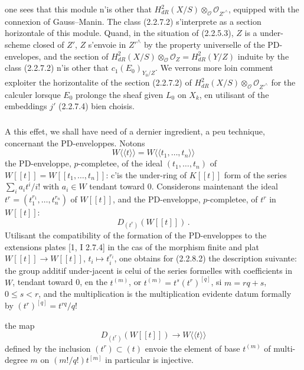 \documentclass[12pt,a4paper]{article}
\theoremstyle{plain}
\theoremstyle{definition}
\theoremstyle{remark}
\begin{document}
one sees that this module n'is other that $H_{dR}^2(X/S) \otimes_\mathcal{O} \mathcal{O}_{Z'^\wedge}$, equipped with the connexion of Gauss--Manin. The class (2.2.7.2) s'interprete as a section horizontale of this module. Quand, in the situation of (2.2.5.3), $Z$ is a under-scheme closed of $Z'$, $Z$ s'envoie in $Z'^\wedge$ by the property universelle of the PD-envelopes, and the section of $H_{dR}^2(X/S) \otimes_\mathcal{O} \mathcal{O}_Z = H_{dR}^2(Y/Z)$ induite by the class (2.2.7.2) n'is other that $c_1(E_0)_{Y_0/Z}$. We verrons more loin comment exploiter the horizontalite of the section (2.2.7.2) of $H_{dR}^2(X/S) \otimes_\mathcal{O} \mathcal{O}_{Z'^\wedge}$ for the calculer lorsque $E_0$ prolonge the sheaf given $L_0$ on $X_k$, en utilisant of the embeddings $j'$ (2.2.7.4) bien choisis.

\subsubsection{}

A this effet, we shall have need of a dernier ingredient, a peu technique, concernant the PD-enveloppes. Notons
\begin{equation}\label{eq:2.2.8.1}
W\langle\langle t \rangle\rangle = W\langle\langle t_1, \ldots, t_n \rangle\rangle
\end{equation}
the PD-enveloppe, $p$-completee, of the ideal $(t_1, \ldots, t_n)$ of $W[[t]] = W[[t_1, \ldots, t_n]]$: c'is the under-ring of $K[[t]]$ form of the series $\sum_i a_i t^i/i!$ with $a_i \in W$ tendant toward 0. Considerons maintenant the ideal $t^r = (t_1^{r_1}, \ldots, t_n^{r_n})$ of $W[[t]]$, and the PD-enveloppe, $p$-completee, of $t^r$ in $W[[t]]$:
\begin{equation}\label{eq:2.2.8.2}
D_{(t^r)}(W[[t]])\,.\end{equation}
Utilisant the compatibility of the formation of the PD-enveloppes to the extensions plates [1, I 2.7.4] in the cas of the morphism finite and plat $W[[t]] \to W[[t]]$, $t_i \mapsto t_i^{r_i}$, one obtains for (2.2.8.2) the description suivante: the group additif under-jacent is celui of the series formelles with coefficients in $W$, tendant toward 0, en the $t^{(m)}$, or $t^{(m)} = t^s(t^r)^{[q]}$, si $m = rq + s$, $0 \leq s < r$, and the multiplication is the multiplication evidente datum formally by $(t^r)^{[q]} = t^{rq}/q!$

the map
\begin{equation}\label{eq:2.2.8.3}
D_{(t^r)}(W[[t]]) \longrightarrow W\langle\langle t \rangle\rangle
\end{equation}
defined by the inclusion $(t^r) \subset (t)$ envoie the element of base $t^{(m)}$ of multi-degree $m$ on $(m!/q!)t^{[m]}$ in particular is injective.
\end{document}
